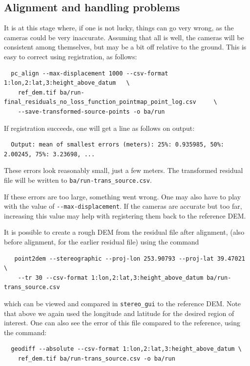 \subsection{Alignment and handling problems}

It is at this stage where, if one is not lucky, things can go very
wrong, as the cameras could be very inaccurate. Assuming that all is
well, the cameras will be consistent among themselves, but may be a bit
off relative to the ground. This is easy to correct using registration,
as follows:
\begin{verbatim}
  pc_align --max-displacement 1000 --csv-format 1:lon,2:lat,3:height_above_datum   \
    ref_dem.tif ba/run-final_residuals_no_loss_function_pointmap_point_log.csv     \
    --save-transformed-source-points -o ba/run
\end{verbatim}

If registration succeeds, one will get a line as follows on output:
\begin{verbatim}
  Output: mean of smallest errors (meters): 25%: 0.935985, 50%: 2.00245, 75%: 3.23698, ...
\end{verbatim}

These errors look reasonably small, just a few meters. The transformed
residual file will be written to \texttt{ba/run-trans\_source.csv}.

If these errors are too large, something went wrong. One may also have to play
with the value of \texttt{-\/-max-displacement}. If the cameras are accurate
but too far, increasing this value may help with registering them back to the reference DEM.

It is possible to create a rough DEM from the residual file after alignment, 
(also before alignment, for the earlier residual file) using the command

\begin{verbatim}
   point2dem --stereographic --proj-lon 253.90793 --proj-lat 39.47021            \
    --tr 30 --csv-format 1:lon,2:lat,3:height_above_datum ba/run-trans_source.csv
\end{verbatim}

which can be viewed and compared in \texttt{stereo\_gui} to the reference DEM. 
Note that above we again used the longitude and latitude for the desired region 
of interest. One can also see the error of this file compared to the reference, using
the command:

\begin{verbatim}
  geodiff --absolute --csv-format 1:lon,2:lat,3:height_above_datum \
    ref_dem.tif ba/run-trans_source.csv -o ba/run
\end{verbatim}

